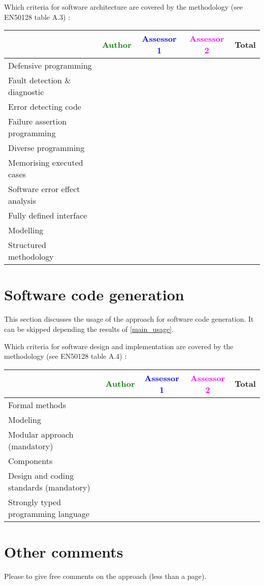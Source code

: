 Which criteria for software architecture are covered by the methodology
(see EN50128 table A.3) :

\begin{tabular}{|l | c | c | c | c|}
\hline
& \textcolor{green}{Author} & \textcolor{blue}{Assessor 1} & \textcolor{magenta}{Assessor 2} & Total \\
\hline
Defensive programming  & & & &  \\
\hline 
Fault detection \& diagnostic  & & & &  \\
\hline
Error detecting code  & & & &  \\
\hline
Failure assertion programming & & & &  \\
\hline
Diverse programming & & & &  \\
\hline
Memorising executed cases & & & &  \\
\hline
Software error effect analysis & & & &  \\
\hline
Fully defined interface & & & &  \\
\hline
Modelling  & & & &  \\
\hline
Structured methodology & & & &  \\
\hline
\end{tabular}

\section{Software code generation}
This section discusses the usage of the approach for software code generation.
It can be skipped depending the results of \ref{main_usage}.

Which criteria for software design and implementation are covered by the methodology
(see EN50128 table A.4) :

\begin{tabular}{|l | c | c | c | c|}
\hline
& \textcolor{green}{Author} & \textcolor{blue}{Assessor 1} & \textcolor{magenta}{Assessor 2} & Total \\
\hline
Formal methods  & & & &  \\
\hline 
Modeling  & & & &  \\
\hline
Modular approach (mandatory) & & & &  \\
\hline
Components & & & &  \\
\hline
Design and coding standards (mandatory) & & & &  \\
\hline
Strongly typed programming language & & & &  \\
\hline

\end{tabular}

\section{Other comments}
Please to  give free comments on the approach (less than a page).



